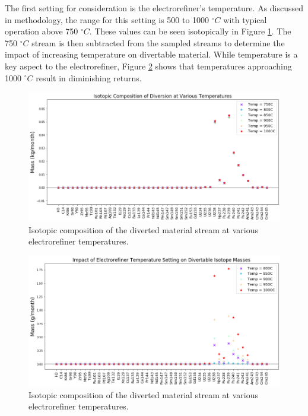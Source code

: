 The first setting for consideration is the electrorefiner's temperature. As discussed in methodology, the range for this setting is 500 to 1000 $^\circ C$ with typical operation above 750 $^\circ C$. These values can be seen isotopically in Figure \ref{fig:ref-temp-sa}.
The 750 $^\circ C$ stream is then subtracted from the sampled streams to determine the impact of increasing temperature on divertable material.
While temperature is a key aspect to the electrorefiner, Figure \ref{fig:ref-temp-diff} shows that temperatures approaching 1000 $^\circ C$ result in diminishing returns.

\begin{figure}
	\includegraphics[width=\linewidth]{images/temperature-sa-comp}
	\caption{Isotopic composition of the diverted material stream at various electrorefiner temperatures.}
	\label{fig:ref-temp-sa}
\end{figure}

\begin{figure}
	\includegraphics[width=\linewidth]{images/temperature-sa-diff}
	\caption{Isotopic composition of the diverted material stream at various electrorefiner temperatures.}
	\label{fig:ref-temp-diff}
\end{figure}


